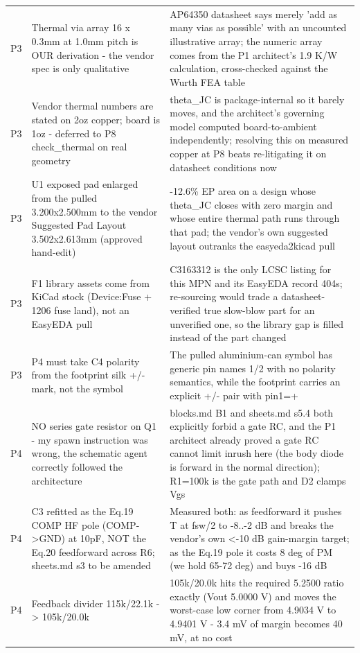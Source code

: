 \documentclass[11pt,a4paper]{article}
\begin{document}
{\begin{longtable}{lp{5.2cm}p{7.2cm}}
P3 & Thermal via array 16 x 0.3mm at 1.0mm pitch is OUR derivation - the vendor spec is only qualitative & AP64350 datasheet says merely 'add as many vias as possible' with an uncounted illustrative array; the numeric array comes from the P1 architect's 1.9 K/W calculation, cross-checked against the Wurth FEA table \\
P3 & Vendor thermal numbers are stated on 2oz copper; board is 1oz - deferred to P8 check\_thermal on real geometry & theta\_JC is package-internal so it barely moves, and the architect's governing model computed board-to-ambient independently; resolving this on measured copper at P8 beats re-litigating it on datasheet conditions now \\
P3 & U1 exposed pad enlarged from the pulled 3.200x2.500mm to the vendor Suggested Pad Layout 3.502x2.613mm (approved hand-edit) & -12.6\% EP area on a design whose theta\_JC closes with zero margin and whose entire thermal path runs through that pad; the vendor's own suggested layout outranks the easyeda2kicad pull \\
P3 & F1 library assets come from KiCad stock (Device:Fuse + 1206 fuse land), not an EasyEDA pull & C3163312 is the only LCSC listing for this MPN and its EasyEDA record 404s; re-sourcing would trade a datasheet-verified true slow-blow part for an unverified one, so the library gap is filled instead of the part changed \\
P3 & P4 must take C4 polarity from the footprint silk +/- mark, not the symbol & The pulled aluminium-can symbol has generic pin names 1/2 with no polarity semantics, while the footprint carries an explicit +/- pair with pin1=+ \\
P4 & NO series gate resistor on Q1 - my spawn instruction was wrong, the schematic agent correctly followed the architecture & blocks.md B1 and sheets.md s5.4 both explicitly forbid a gate RC, and the P1 architect already proved a gate RC cannot limit inrush here (the body diode is forward in the normal direction); R1=100k is the gate path and D2 clamps Vgs \\
P4 & C3 refitted as the Eq.19 COMP HF pole (COMP-\textgreater{}GND) at 10pF, NOT the Eq.20 feedforward across R6; sheets.md s3 to be amended & Measured both: as feedforward it pushes \textbar{}T\textbar{} at fsw/2 to -8..-2 dB and breaks the vendor's own \textless{}-10 dB gain-margin target; as the Eq.19 pole it costs 8 deg of PM (we hold 65-72 deg) and buys -16 dB \\
P4 & Feedback divider 115k/22.1k -\textgreater{} 105k/20.0k & 105k/20.0k hits the required 5.2500 ratio exactly (Vout 5.0000 V) and moves the worst-case low corner from 4.9034 V to 4.9401 V - 3.4 mV of margin becomes 40 mV, at no cost \\

\end{longtable}}
\end{document}
